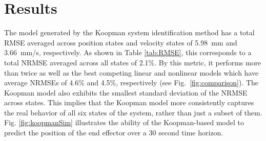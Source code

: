 \section{Results}
\label{sec:results}

The model generated by the Koopman system identification method has a total RMSE averaged across position states and velocity states of {5.98~mm} and {3.66~mm/s}, respectively.
As shown in Table \ref{tab:RMSE}, this corresponds to a total NRMSE averaged across all states of 2.1\%. 
By this metric, it performs more than twice as well as the best competing linear and nonlinear models which have average NRMSEs of 4.6\% and 4.5\%, respectively (see Fig.~\ref{fig:comparison}).
The Koopman model also exhibits the smallest standard deviation of the NRMSE across states.
This implies that the Koopman model more consistently captures the real behavior of all six states of the system, rather than just a subset of them.
Fig. \ref{fig:koopmanSim} illustrates the ability of the Koopman-based model to predict the position of the end effector over a 30 second time horizon.



